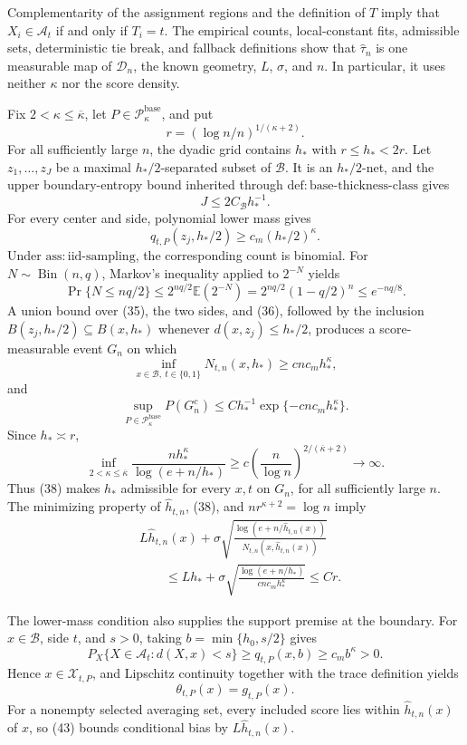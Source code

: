 Complementarity of the assignment regions and the definition of \(T\)
imply that \(X_i\in\mathcal A_t\) if and only if \(T_i=t\).  The empirical
counts, local-constant fits, admissible sets, deterministic tie break, and
fallback definitions show that \(\widehat\tau_n\) is one measurable map
of \(\mathcal D_n\), the known geometry, \(L\), \(\sigma\), and \(n\).
In particular, it uses neither \(\kappa\) nor the score density.

Fix \(2<\kappa\le\overline\kappa\), let
\(P\in\mathcal P_{\kappa}^{\mathrm{base}}\), and put
\[
 r=(\log n/n)^{1/(\kappa+2)}.
\]
For all sufficiently large \(n\), the dyadic grid contains \(h_*\) with
\(r\le h_*<2r\).  Let \(z_1,\ldots,z_J\) be a maximal
\(h_*/2\)-separated subset of \(\mathcal B\).  It is an
\(h_*/2\)-net, and the upper boundary-entropy bound inherited through
\(\mathrm{def:base\text{-}thickness\text{-}class}\) gives
\[
 J\le2C_{\mathcal B}h_*^{-1}.
 \tag{35}
\]
For every center and side, polynomial lower mass gives
\[
 q_{t,P}(z_j,h_*/2)\ge c_m(h_*/2)^\kappa.
 \tag{36}
\]
Under \(\mathrm{ass:iid\text{-}sampling}\), the corresponding count is
binomial.  For \(N\sim\operatorname{Bin}(n,q)\), Markov's inequality
applied to \(2^{-N}\) yields
\[
 \Pr\{N\le nq/2\}
 \le2^{nq/2}\mathbb E(2^{-N})
 =2^{nq/2}(1-q/2)^n
 \le e^{-nq/8}.
 \tag{37}
\]
A union bound over (35), the two sides, and (36), followed by the inclusion
\(B(z_j,h_*/2)\subseteq B(x,h_*)\) whenever
\(d(x,z_j)\le h_*/2\), produces a score-measurable event \(G_n\) on
which
\[
 \inf_{x\in\mathcal B,\ t\in\{0,1\}}N_{t,n}(x,h_*)
 \ge c n c_mh_*^\kappa,
 \tag{38}
\]
and
\[
 \sup_{P\in\mathcal P_{\kappa}^{\mathrm{base}}}P(G_n^c)
 \le Ch_*^{-1}\exp\{-c n c_mh_*^\kappa\}.
 \tag{39}
\]
Since \(h_*\asymp r\),
\[
 \inf_{2<\kappa\le\overline\kappa}
 \frac{nh_*^\kappa}{\log(e+n/h_*)}
 \ge c\left(\frac n{\log n}\right)^{2/(\overline\kappa+2)}
 \longrightarrow\infty.
 \tag{40}
\]
Thus (38) makes \(h_*\) admissible for every \(x,t\) on \(G_n\), for
all sufficiently large \(n\).  The minimizing property of
\(\widehat h_{t,n}\), (38), and \(nr^{\kappa+2}=\log n\) imply
\[
 \begin{aligned}
 &L\widehat h_{t,n}(x)
 +\sigma\sqrt{\frac{\log(e+n/\widehat h_{t,n}(x))}
 {N_{t,n}(x,\widehat h_{t,n}(x))}}\\
 &\qquad\le Lh_*+
 \sigma\sqrt{\frac{\log(e+n/h_*)}{c n c_mh_*^\kappa}}
 \le Cr.
 \end{aligned}
 \tag{41}
\]

The lower-mass condition also supplies the support premise at the
boundary.  For \(x\in\mathcal B\), side \(t\), and \(s>0\), taking
\(b=\min\{h_0,s/2\}\) gives
\[
 P_X\{X\in\mathcal A_t:d(X,x)<s\}
 \ge q_{t,P}(x,b)\ge c_mb^\kappa>0.
 \tag{42}
\]
Hence \(x\in\mathcal X_{t,P}\), and Lipschitz continuity together with
the trace definition yields
\[
 \theta_{t,P}(x)=g_{t,P}(x).
 \tag{43}
\]
For a nonempty selected averaging set, every included score lies within
\(\widehat h_{t,n}(x)\) of \(x\), so (43) bounds conditional bias by
\(L\widehat h_{t,n}(x)\).

